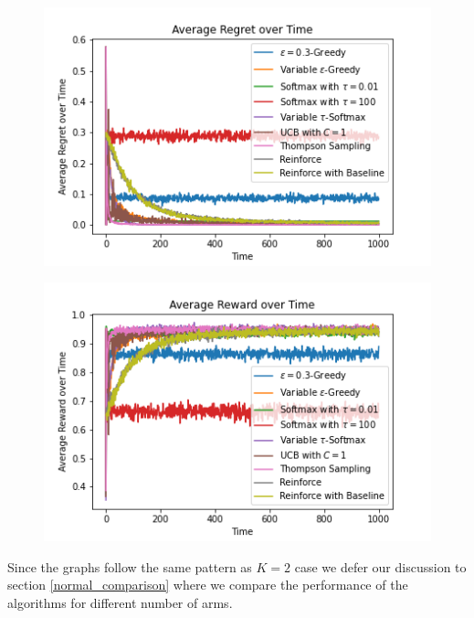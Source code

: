 \documentclass{article}
\begin{document}
			\begin{figure}[H]
			\graphicspath{ {../Experiments/Normal_10_0.01_every_case/} }
			\centering
			\begin{minipage}{.5\textwidth}
			  \centering
			  \includegraphics[width=\linewidth]{Average_Regret_over_Time.png}
			  \label{fig:test1}
			\end{minipage}%
			\begin{minipage}{.5\textwidth}
			  \centering
			  \includegraphics[width=\linewidth]{Average_Reward_over_Time.png}
			  \label{fig:test2}
			\end{minipage}
			\end{figure}
		
		Since the graphs follow the same pattern as $K=2$ case we defer our discussion to section \ref{normal_comparison} where we compare the performance of the algorithms for
		different number of arms.
		
\end{document}
